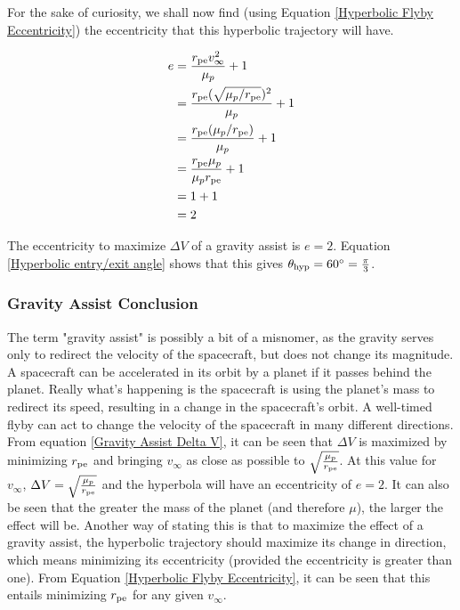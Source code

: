 \documentclass[../basicOrbitalDynamics.tex]{subfiles}
\begin{document}
For the sake of curiosity, we shall now find (using Equation \eqref{Hyperbolic Flyby Eccentricity}) the eccentricity that this hyperbolic trajectory will have.

\begin{align*}
    e & = \frac{{r}_\text{pe}v_\infty^2}{\mu_p}+1                   \\
      & = \frac{{r}_\text{pe}(\sqrt{\mu_p/{r}_\text{pe}})^2}{\mu_p}+1 \\
      & = \frac{{r}_\text{pe}(\mu_p/{r}_\text{pe})}{\mu_p}+1          \\
      & = \frac{{r}_\text{pe}\mu_p}{\mu_p {r}_\text{pe}}+1            \\
      & = 1+1                                                     \\
      & = 2
\end{align*}

The eccentricity to maximize $\Delta V$ of a gravity assist is $e=2$. Equation \eqref{Hyperbolic entry/exit angle} shows that this gives ${\theta}_\text{hyp}=60^{\circ}=\frac{\pi}{3}$.

\subsubsection{Gravity Assist Conclusion}

The term "gravity assist" is possibly a bit of a misnomer, as the gravity serves only to redirect the velocity of the spacecraft, but does not change its magnitude. A spacecraft can be accelerated in its orbit by a planet if it passes behind the planet. Really what's happening is the spacecraft is using the planet's mass to redirect its speed, resulting in a change in the spacecraft's orbit. A well-timed flyby can act to change the velocity of the spacecraft in many different directions. From equation \eqref{Gravity Assist Delta V}, it can be seen that $\Delta V$ is maximized by minimizing ${r}_\text{pe}$ and bringing $v_\infty$ as close as possible to $\sqrt{\frac{\mu_p}{{r}_\text{pe}}}$. At this value for $v_\infty$, $\Delta V = \sqrt{\frac{\mu_p}{{r}_\text{pe}}}$ and the hyperbola will have an eccentricity of $e=2$. It can also be seen that the greater the mass of the planet (and therefore $\mu$), the larger the effect will be. Another way of stating this is that to maximize the effect of a gravity assist, the hyperbolic trajectory should maximize its change in direction, which means minimizing its eccentricity (provided the eccentricity is greater than one). From Equation \eqref{Hyperbolic Flyby Eccentricity}, it can be seen that this entails minimizing ${r}_\text{pe}$ for any given $v_\infty$.
\end{document}
